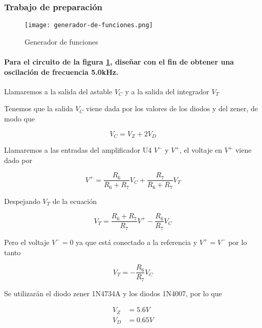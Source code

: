 \subsubsection{Trabajo de preparación}

\begin{figure}[ht]
    \centering
    \texttt{[image: generador-de-funciones.png]}
    \caption{Generador de funciones}
    \label{fig:generador-funciones}
\end{figure}

\paragraph{Para el circuito de la figura \ref{fig:generador-funciones}, diseñar con el fin de obtener una oscilación de frecuencia 5.0kHz.\\}

Llamaremos a la salida del astable $V_{C}$ y a la salida del integrador $V_{T}$

Tenemos que la salida $V_{C}$ viene dada por los valores de los diodos y del zener, de modo que 

\begin{equation}
    V_{C} = V_{Z} + 2 V_{D}
\end{equation}

Llamaremos a las entradas del amplificador U4 $V^-$ y $V^+$, el voltaje en $V^+$ viene dado por

\begin{equation*}
    V^+ = \frac{R_6}{R_6 + R_7} V_C + \frac{R_7}{R_6 + R_7} V_T
\end{equation*}

Despejando $V_T$ de la ecuación

\begin{equation*}
    V_T = \frac{R_6 + R_7}{R_7} V^+ - \frac{R_6}{R_7} V_C
\end{equation*}

Pero el voltaje $V^- = 0$ ya que está conectado a la referencia y $V^+ = V^-$ por lo tanto

\begin{equation}
    V_T = - \frac{R_6}{R_7} V_C
\end{equation}

Se utilizarán el diodo zener 1N4734A y los diodos 1N4007, por lo que

\begin{align*}
    V_Z &= 5.6 V \\
    V_D &= 0.65 V
\end{align*}

